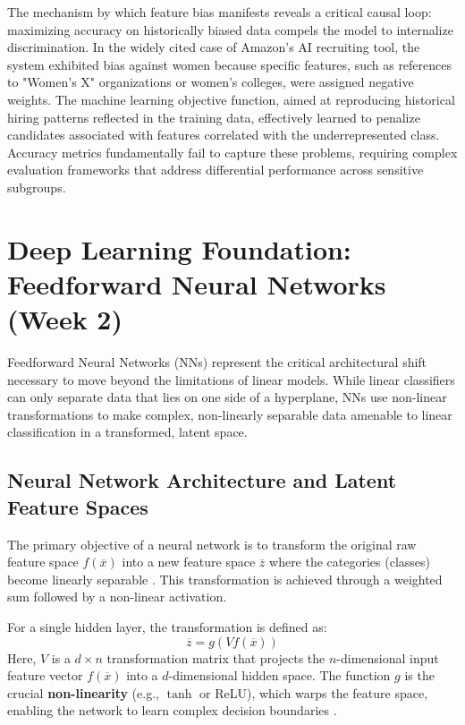 \documentclass{article}
\begin{document}
The mechanism by which feature bias manifests reveals a critical causal loop: maximizing accuracy on historically biased data compels the model to internalize discrimination. In the widely cited case of Amazon’s AI recruiting tool, the system exhibited bias against women because specific features, such as references to "Women's X" organizations or women's colleges, were assigned negative weights. The machine learning objective function, aimed at reproducing historical hiring patterns reflected in the training data, effectively learned to penalize candidates associated with features correlated with the underrepresented class. Accuracy metrics fundamentally fail to capture these problems, requiring complex evaluation frameworks that address differential performance across sensitive subgroups.

\section{Deep Learning Foundation: Feedforward Neural Networks (Week 2)}

Feedforward Neural Networks (NNs) represent the critical architectural shift necessary to move beyond the limitations of linear models. While linear classifiers can only separate data that lies on one side of a hyperplane, NNs use non-linear transformations to make complex, non-linearly separable data amenable to linear classification in a transformed, latent space.

\subsection{Neural Network Architecture and Latent Feature Spaces}

The primary objective of a neural network is to transform the original raw feature space $f(\overline{x})$ into a new feature space $\overline{z}$ where the categories (classes) become linearly separable . This transformation is achieved through a weighted sum followed by a non-linear activation.

For a single hidden layer, the transformation is defined as:
$$\overline{z} = g(Vf(\overline{x}))$$
Here, $V$ is a $d \times n$ transformation matrix that projects the $n$-dimensional input feature vector $f(\overline{x})$ into a $d$-dimensional hidden space. The function $g$ is the crucial \textbf{non-linearity} (e.g., $\tanh$ or ReLU), which warps the feature space, enabling the network to learn complex decision boundaries .
\end{document}

